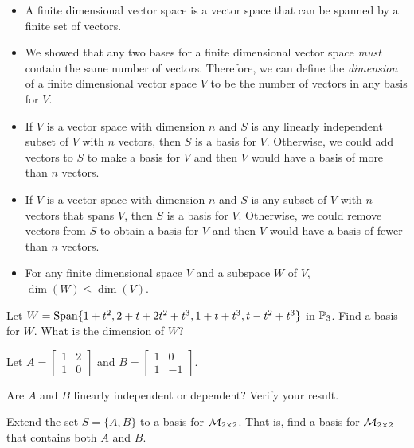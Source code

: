\begin{itemize}
\item A finite dimensional vector space is a vector space that can be spanned by a finite set of vectors.
\item We showed that any two bases for a finite dimensional vector space \emph{must} contain the same number of vectors. Therefore, we can define the \emph{dimension} of a finite dimensional vector space $V$ to be the number of vectors in any basis for $V$.
\item If $V$ is a vector space with dimension $n$ and $S$ is any linearly independent subset of $V$ with $n$ vectors, then $S$ is a basis for $V$. Otherwise, we could add vectors to $S$ to make a basis for $V$ and then $V$ would have a basis of more than $n$ vectors. 
\item If $V$ is a vector space with dimension $n$ and $S$ is any subset of $V$ with $n$ vectors that spans $V$, then $S$ is a basis for $V$. Otherwise, we could remove vectors from $S$ to obtain a basis for $V$ and then $V$ would have a basis of fewer than $n$ vectors. 
\item For any finite dimensional space $V$ and a subspace $W$ of $V$, $\dim(W)\leq \dim(V)$.
\end{itemize}

\label{sec:dims_exer}
\be


\item Let $W = \text{Span}\{ 1+t^2, 2+t+2t^2+t^3, 1+t+t^3, t-t^2+t^3\}$ in $\mathbb{P}_3$. Find a basis for $W$. What is the dimension of $W$?

\item Let $A = \left[ \begin{array}{cc} 1&2\\1&0 \end{array} \right]$ and $B = \left[ \begin{array}{cr} 1&0\\1&-1 \end{array} \right]$.
	\ba
	\item Are $A$ and $B$ linearly independent or dependent? Verify your result.
	\item Extend the set $S = \{A,B\}$ to a basis for $\mathcal{M}_{2 \times 2}$. That is, find a basis for $\mathcal{M}_{2 \times 2}$ that contains both $A$ and $B$. 
	\ea
	
